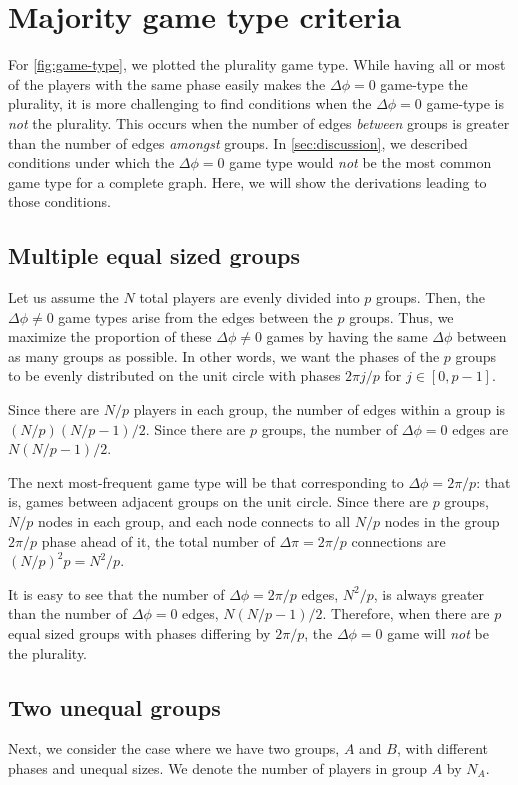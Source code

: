 \section{Majority game type criteria}
For \cref{fig:game-type}, we plotted the plurality game type.
While having all or most of the players with the same phase
easily makes the $\Delta \phi = 0$ game-type the plurality,
it is more challenging to find conditions
when the $\Delta \phi = 0$ game-type is \emph{not} the plurality.
This occurs when the number of edges \emph{between} groups
is greater than the number of edges \emph{amongst} groups.
In \cref{sec:discussion}, we described conditions under which
the $\Delta \phi = 0$ game type would \emph{not} be the most common game type
for a complete graph.
Here, we will show the derivations leading to those conditions.

\subsection{Multiple equal sized groups}
\label{sec:multiple_equal_groups}
Let us assume the $N$ total players are evenly divided
into $p$ groups.
Then, the $\Delta \phi \neq 0$ game types
arise from the edges between the $p$ groups.
Thus, we maximize the proportion of these $\Delta \phi \neq 0$ games
by having the same $\Delta \phi$ between as many groups as possible.
In other words, we want the phases of the $p$ groups
to be evenly distributed on the unit circle with phases $2 \pi j/p$
for $j \in [0,p-1]$.

Since there are $N/p$ players in each group,
the number of edges within a group is $(N/p)(N/p - 1)/2$.
Since there are $p$ groups, the number of $\Delta \phi = 0$ edges are
$N (N/p - 1)/2$.

The next most-frequent game type will be that corresponding to
$\Delta \phi = 2 \pi/p$:
that is, games between adjacent groups on the unit circle.
Since there are $p$ groups,
$N/p$ nodes in each group,
and each node connects to all $N/p$ nodes in the group
$2 \pi/p$ phase ahead of it,
the total number of $\Delta \pi = 2 \pi/p$ connections
are $(N/p)^2 p = N^2/p$.

It is easy to see that the number of $\Delta \phi = 2\pi/p$ edges,
$N^2/p$,
is always greater than the number of $\Delta \phi = 0$ edges,
$N(N/p - 1)/2$.
Therefore, when there are $p$ equal sized groups
with phases differing by $2\pi/p$,
the $\Delta \phi = 0$ game will \emph{not} be the plurality.

\subsection{Two unequal groups}
\label{sec:two_unequal_groups}
Next, we consider the case where we have two groups, $A$ and $B$,
with different phases and unequal sizes.
We denote the number of players in group $A$ by $N_A$.

